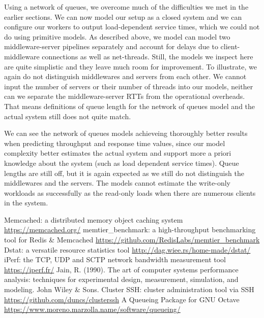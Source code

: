 \documentclass[11pt,a4paper]{article}
\begin{document}
\par Using a network of queues, we overcome much of the difficulties we met in the earlier sections. We can now model our setup as a closed system and we can configure our workers to output load-dependent service times, which we could not do using primitive models. As described above, we model can model two middleware-server pipelines separately and account for delays due to client-middleware connections as well as net-threads. Still, the models we inspect here are quite simplistic and they leave much room for improvement. To illustrate, we again do not distinguish middlewares and servers from each other. We cannot input the number of servers or their number of threads into our models, neither can we separate the middleware-server RTTs from the operational overheads. That means definitions of queue length for the network of queues model and the actual system still does not quite match.
\par We can see the network of queues models achieveing thoroughly better results when predicting throughput and response time values, since our model complexity better estimates the actual system and support more a priori knowledge about the system (such as load dependent service times). Queue lengths are still off, but it is again expected as we still do not distinguish the middlewares and the servers. The models cannot estimate the write-only workloads as successfully as the read-only loads when there are numerous clients in the system. 

\clearpage
\begin{thebibliography}{9}
 Memcached: a distributed memory object caching system \url{https://memcached.org/}
 memtier\_benchmark: a high-throughput benchmarking tool for Redis \& Memcached \url{https://github.com/RedisLabs/memtier\_benchmark}
 Dstat: a versatile resource statistics tool \url{http://dag.wiee.rs/home-made/dstat/}
 iPerf: the TCP, UDP and SCTP network bandwidth measurement tool \url{https://iperf.fr/}
 Jain, R. (1990). The art of computer systems performance analysis: techniques for experimental design, measurement, simulation, and modeling. John Wiley \& Sons.
 Cluster SSH: cluster administration tool via SSH \url{https://github.com/duncs/clusterssh}
 A Queueing Package for GNU Octave \url{https://www.moreno.marzolla.name/software/queueing/}
\end{thebibliography}
\end{document}
